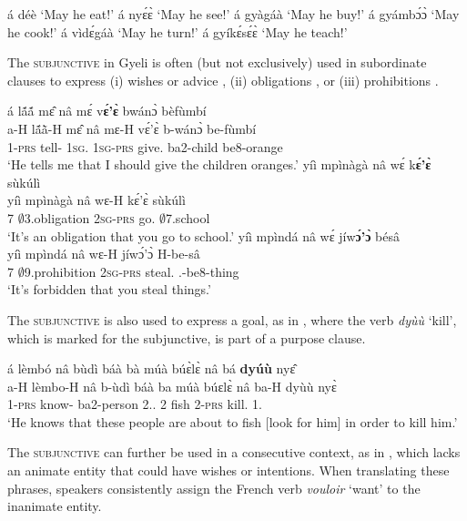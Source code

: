 \ea\label{SBJVforms}
\ea  á déè   `May he eat!'
\ex á nyɛ́ɛ̀ `May he see!'
\ex á gyàgáà `May he buy!' 
\ex á gyámbɔ́ɔ̀ `May he cook!'
\ex á vìdɛ́gáà `May he turn!'
\ex á gyíkɛ́sɛ́ɛ̀ `May he teach!'
\z
\z

The \textsc{subjunctive} in Gyeli is often (but not exclusively) used in subordinate clauses to express (i) wishes or advice , (ii) obligations , or (iii) prohibitions .

\ea\label{SBJV}
\ea \label{SBJV1}
  \glll   á lã́ã́ mɛ̂ nâ mɛ́ v{\bfseries ɛ́'ɛ̀} bwánɔ̀ bèfùmbí \\
         a-H lã́ã̀-H mɛ̂ nâ mɛ-H vɛ́'ɛ̀ b-wánɔ̀ be-fùmbí \\
             1-\textsc{prs} tell-{\R} 1\textsc{sg}.{\OBJ} {\COMP} 1\textsc{sg}-\textsc{prs} give.{\SBJV} ba2-child be8-orange\\
    \trans `He tells me that I should give the children oranges.'
\ex \label{SBJV2}
  \glll  yíì mpìnàgà nâ wɛ́ k{\bfseries ɛ́'ɛ̀} sùkúlì \\
         yíì mpìnàgà nâ wɛ-H kɛ́'ɛ̀ sùkúlì\\
              7 $\emptyset$3.obligation {\COMP} 2\textsc{sg}-\textsc{prs} go.{\SBJV} $\emptyset$7.school\\
    \trans `It's an obligation that you go to school.'
\ex \label{SBJV3}
  \glll  yíì mpìndá nâ wɛ́ jíw{\bfseries ɔ́'ɔ̀} bésâ \\
           yíì mpìndá nâ wɛ-H jíwɔ́'ɔ̀ H-be-sâ\\
              7 $\emptyset$9.prohibition {\COMP} 2\textsc{sg}-\textsc{prs} steal.{\SBJV} {\OBJ}.{\LINK}-be8-thing\\
    \trans `It's forbidden that you steal things.'
\z
\z

The \textsc{subjunctive} is also used to express a goal, as in , where the verb {\itshape dyùù} `kill', which is marked for the subjunctive, is part of a purpose clause.

\ea\label{SBJVb}
  \glll   á lèmbó nâ bùdì báà bà múà búɛ̀lɛ̀ nâ bá {\bfseries dyúù} nyɛ̂  \\
a-H lèmbo-H nâ b-ùdì báà ba múà búɛlɛ̀ nâ ba-H dyùù nyɛ̀  \\
1-\textsc{prs} know-{\R} {\COMP} ba2-person 2.{\DEM}.{\PROX} 2 {\PROSP} fish {\COMP} 2-\textsc{prs} kill.{\SBJV} 1.{\OBJ}   \\
    \trans `He knows that these people are about to fish [look for him] in order to kill him.'
\z

The \textsc{subjunctive} can further be used in a consecutive context, as in , which lacks an animate entity that could have wishes or intentions. When translating these phrases, speakers consistently assign the French verb {\itshape vouloir} `want' to the inanimate entity. %

